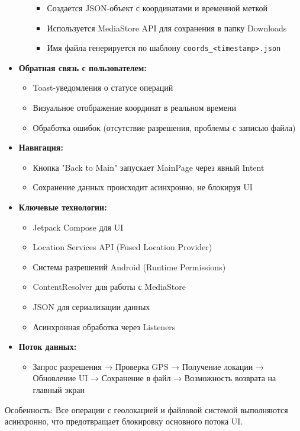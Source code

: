 \begin{itemize}
\begin{itemize}
            \begin{itemize}
                \item Создается JSON-объект с координатами и временной меткой
                \item Используется MediaStore API для сохранения в папку Downloads
                \item Имя файла генерируется по шаблону \texttt{coords\_<timestamp>.json}
            \end{itemize}
        \end{itemize}
    \item \textbf{Обратная связь с пользователем:}
        \begin{itemize}
            \item Toast-уведомления о статусе операций
            \item Визуальное отображение координат в реальном времени
            \item Обработка ошибок (отсутствие разрешения, проблемы с записью файла)
        \end{itemize}
    \item \textbf{Навигация:}
        \begin{itemize}
            \item Кнопка "Back to Main" запускает MainPage через явный Intent
            \item Сохранение данных происходит асинхронно, не блокируя UI
        \end{itemize}
    \item \textbf{Ключевые технологии:}
        \begin{itemize}
            \item Jetpack Compose для UI
            \item Location Services API (Fused Location Provider)
            \item Система разрешений Android (Runtime Permissions)
            \item ContentResolver для работы с MediaStore
            \item JSON для сериализации данных
            \item Асинхронная обработка через Listeners
        \end{itemize}
    \item \textbf{Поток данных:}
        \begin{itemize}
            \item Запрос разрешения → Проверка GPS → Получение локации → Обновление UI → Сохранение в файл → Возможность возврата на главный экран
        \end{itemize}
\end{itemize}

Особенность: Все операции с геолокацией и файловой системой выполняются асинхронно, что предотвращает блокировку основного потока UI.
